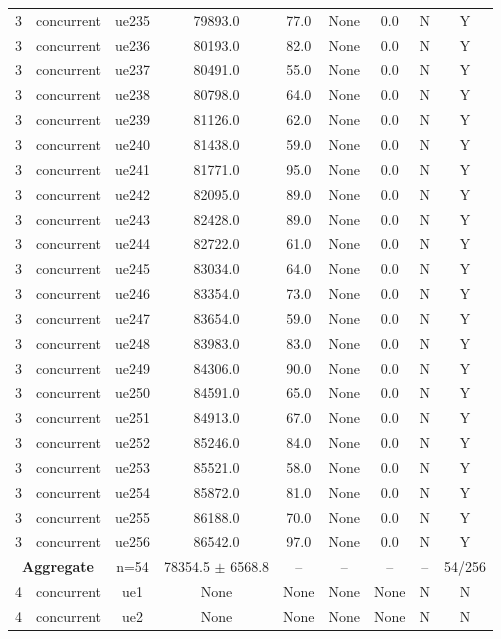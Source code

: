 \begin{table}[ht]
\begin{tabular}{|c|c|c|c|c|c|c|c|c|}
3 & concurrent & ue235 & 79893.0 & 77.0 & None & 0.0 & N & Y \\
3 & concurrent & ue236 & 80193.0 & 82.0 & None & 0.0 & N & Y \\
3 & concurrent & ue237 & 80491.0 & 55.0 & None & 0.0 & N & Y \\
3 & concurrent & ue238 & 80798.0 & 64.0 & None & 0.0 & N & Y \\
3 & concurrent & ue239 & 81126.0 & 62.0 & None & 0.0 & N & Y \\
3 & concurrent & ue240 & 81438.0 & 59.0 & None & 0.0 & N & Y \\
3 & concurrent & ue241 & 81771.0 & 95.0 & None & 0.0 & N & Y \\
3 & concurrent & ue242 & 82095.0 & 89.0 & None & 0.0 & N & Y \\
3 & concurrent & ue243 & 82428.0 & 89.0 & None & 0.0 & N & Y \\
3 & concurrent & ue244 & 82722.0 & 61.0 & None & 0.0 & N & Y \\
3 & concurrent & ue245 & 83034.0 & 64.0 & None & 0.0 & N & Y \\
3 & concurrent & ue246 & 83354.0 & 73.0 & None & 0.0 & N & Y \\
3 & concurrent & ue247 & 83654.0 & 59.0 & None & 0.0 & N & Y \\
3 & concurrent & ue248 & 83983.0 & 83.0 & None & 0.0 & N & Y \\
3 & concurrent & ue249 & 84306.0 & 90.0 & None & 0.0 & N & Y \\
3 & concurrent & ue250 & 84591.0 & 65.0 & None & 0.0 & N & Y \\
3 & concurrent & ue251 & 84913.0 & 67.0 & None & 0.0 & N & Y \\
3 & concurrent & ue252 & 85246.0 & 84.0 & None & 0.0 & N & Y \\
3 & concurrent & ue253 & 85521.0 & 58.0 & None & 0.0 & N & Y \\
3 & concurrent & ue254 & 85872.0 & 81.0 & None & 0.0 & N & Y \\
3 & concurrent & ue255 & 86188.0 & 70.0 & None & 0.0 & N & Y \\
3 & concurrent & ue256 & 86542.0 & 97.0 & None & 0.0 & N & Y \\
\multicolumn{2}{|c|}{\textbf{Aggregate}} & n=54 & 78354.5 $\pm$ 6568.8 & -- & -- & -- & -- & 54/256 \\
\hline
4 & concurrent & ue1 & None & None & None & None & N & N \\
4 & concurrent & ue2 & None & None & None & None & N & N \\

\end{tabular}
\end{table}
